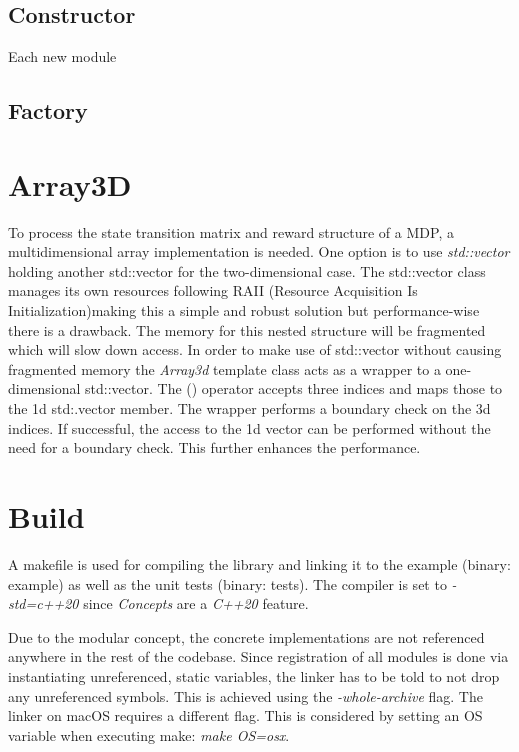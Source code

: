 \subsection{Constructor}
Each new module 


\subsection{Factory}


\section{Array3D}
\label{array}
To process the state transition matrix and reward structure of a MDP, a multidimensional array implementation is needed. One option is to use \emph{std::vector} holding another std::vector for the two-dimensional case. The std::vector class manages its own resources following RAII (Resource Acquisition Is Initialization)making this a simple and robust solution but performance-wise there is a drawback. The memory for this nested structure will be fragmented which will slow down access. 
In order to make use of std::vector without causing fragmented memory the \emph{Array3d} template class acts as a wrapper to a one-dimensional std::vector. The () operator accepts three indices and maps those to the 1d std:.vector member. The wrapper performs a boundary check on the 3d indices. If successful, the access to the 1d vector can be performed without the need for a boundary check. This further enhances the performance.  

\section{Build}

A makefile is used for compiling the library and linking it to the example (binary: example) as well as the unit tests (binary: tests). The compiler is set to \emph{-std=c++20} since \emph{Concepts} are a \emph{C++20} feature. 

Due to the modular concept, the concrete implementations are not referenced anywhere in the rest of the codebase. Since registration of all modules is done via instantiating unreferenced, static variables, the linker has to be told to not drop any unreferenced symbols. This is achieved using the \emph{-whole-archive} flag. The linker on macOS requires a different flag. This is considered by setting an OS variable when executing make: \emph{make OS=osx}.



